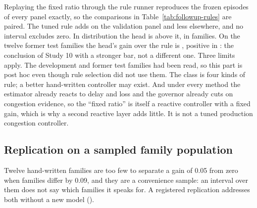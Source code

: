 \documentclass[10pt]{article}
\begin{document}
Replaying the fixed ratio through the rule runner reproduces the frozen episodes of every panel exactly, so the comparisons in Table~\ref{tab:followup-rules} are paired. The tuned rule adds \TypedRuleValRuleVsFixed{} \TypedRuleValRuleVsFixedT{} on the validation panel and less elsewhere, and no interval excludes zero. In distribution the head is \TypedRuleValHeadVsRule{} \TypedRuleValHeadVsRuleT{} above it, in \TypedRuleValHeadVsRulePositive{} families. On the twelve former test families the head's gain over the rule is \TypedRuleTestHeadVsRule{} \TypedRuleTestHeadVsRuleT{}, positive in \TypedRuleTestHeadVsRulePositive{}: the conclusion of Study 10 with a stronger bar, not a different one. Three limits apply. The development and former test families had been read, so this part is post hoc even though rule selection did not use them. The class is four kinds of rule; a better hand-written controller may exist. And under every method the estimator already reacts to delay and loss and the governor already cuts on congestion evidence, so the ``fixed ratio'' is itself a reactive controller with a fixed gain, which is why a second reactive layer adds little. It is not a tuned production congestion controller.

\subsection{Replication on a sampled family population}
\label{sec:typed-replication}
Twelve hand-written families are too few to separate a gain of 0.05 from zero when families differ by 0.09, and they are a convenience sample: an interval over them does not say which families it speaks for. A registered replication addresses both without a new model ().
\end{document}
